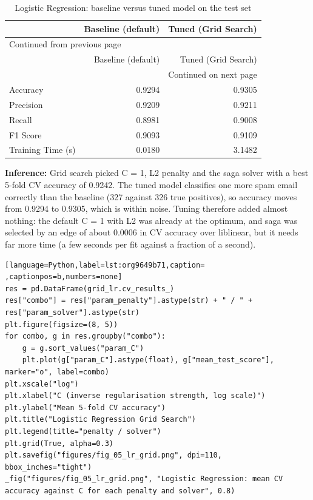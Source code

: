 \documentclass[11pt]{article}
\begin{document}
\begin{longtable}{|l|r|r|}
\caption{Logistic Regression: baseline versus tuned model on the test set}
\\[0pt]
\hline
 & Baseline (default) & Tuned (Grid Search)\\[0pt]
\hline
\endfirsthead
\multicolumn{3}{l}{Continued from previous page} \\[0pt]
\hline

 & Baseline (default) & Tuned (Grid Search) \\[0pt]

\hline
\endhead
\hline\multicolumn{3}{r}{Continued on next page} \\
\endfoot
\endlastfoot
\hline
Accuracy & 0.9294 & 0.9305\\[0pt]
\hline
Precision & 0.9209 & 0.9211\\[0pt]
\hline
Recall & 0.8981 & 0.9008\\[0pt]
\hline
F1 Score & 0.9093 & 0.9109\\[0pt]
\hline
Training Time (s) & 0.0180 & 3.1482\\[0pt]
\hline
\end{longtable}

\textbf{Inference:} Grid search picked C = 1, L2 penalty and the saga solver with a best 5-fold CV accuracy of
0.9242. The tuned model classifies one more spam email correctly than the baseline (327
against 326 true positives), so accuracy moves from 0.9294 to 0.9305, which is within noise.
Tuning therefore added almost nothing: the default C = 1 with L2 was already at the optimum,
and saga was selected by an edge of about 0.0006 in CV accuracy over liblinear, but it needs
far more time (a few seconds per fit against a fraction of a second).
\begin{lstlisting}[language=Python,label=lst:org9649b71,caption= ,captionpos=b,numbers=none]
res = pd.DataFrame(grid_lr.cv_results_)
res["combo"] = res["param_penalty"].astype(str) + " / " + res["param_solver"].astype(str)
plt.figure(figsize=(8, 5))
for combo, g in res.groupby("combo"):
    g = g.sort_values("param_C")
    plt.plot(g["param_C"].astype(float), g["mean_test_score"], marker="o", label=combo)
plt.xscale("log")
plt.xlabel("C (inverse regularisation strength, log scale)")
plt.ylabel("Mean 5-fold CV accuracy")
plt.title("Logistic Regression Grid Search")
plt.legend(title="penalty / solver")
plt.grid(True, alpha=0.3)
plt.savefig("figures/fig_05_lr_grid.png", dpi=110, bbox_inches="tight")
_fig("figures/fig_05_lr_grid.png", "Logistic Regression: mean CV accuracy against C for each penalty and solver", 0.8)
\end{lstlisting}
\end{document}
